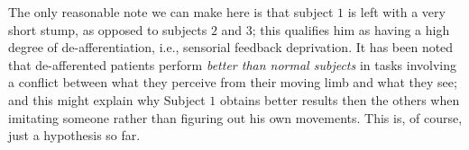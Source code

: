 The only reasonable note we can make here is that subject $1$ is left
with a very short stump, as opposed to subjects $2$ and $3$; this
qualifies him as having a high degree of de-afferentiation, i.e.,
sensorial feedback deprivation. It has been noted \cite{lajoie,miall}
that de-afferented patients perform \emph{better than normal subjects}
in tasks involving a conflict between what they perceive from their
moving limb and what they see; and this might explain why Subject $1$
obtains better results then the others when imitating someone rather
than figuring out his own movements. This is, of course, just a
hypothesis so far.
